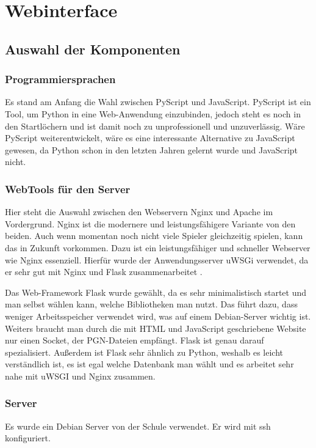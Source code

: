 \section{Webinterface}

\subsection{Auswahl der Komponenten}

\subsubsection{Programmiersprachen}
Es stand am Anfang die Wahl zwischen PyScript und JavaScript. PyScript ist ein Tool, um Python 
in eine Web-Anwendung einzubinden, jedoch steht es noch in den Startlöchern und ist damit noch 
zu unprofessionell und unzuverlässig. Wäre PyScript weiterentwickelt, wäre es eine interessante 
Alternative zu JavaScript gewesen, da Python schon in den letzten Jahren gelernt wurde und 
JavaScript nicht. 

\subsubsection{WebTools für den Server}
Hier steht die Auswahl zwischen den Webservern Nginx und Apache im Vordergrund. Nginx ist die 
modernere und leistungsfähigere Variante von den beiden. Auch wenn momentan noch nicht viele 
Spieler gleichzeitig spielen, kann das in Zukunft vorkommen. Dazu ist ein leistungsfähiger und 
schneller Webserver wie Nginx essenziell. Hierfür wurde der Anwendungsserver uWSGi verwendet, 
da er sehr gut mit Nginx und Flask zusammenarbeitet \cite{FlaskDeploying}. 

Das Web-Framework Flask wurde gewählt, da es sehr minimalistisch startet und man selbst wählen 
kann, welche Bibliotheken man nutzt. Das führt dazu, dass weniger Arbeitsspeicher verwendet wird, 
was auf einem Debian-Server wichtig ist. Weiters braucht man durch die mit HTML und JavaScript 
geschriebene Website nur einen Socket, der PGN-Dateien empfängt. Flask ist genau darauf 
spezialisiert. Außerdem ist Flask sehr ähnlich zu Python, weshalb es leicht verständlich ist, 
es ist egal welche Datenbank man wählt und es arbeitet sehr nahe mit uWSGI und Nginx zusammen. 

\subsubsection{Server}
Es wurde ein Debian Server von der Schule verwendet. Er wird mit ssh konfiguriert. 

